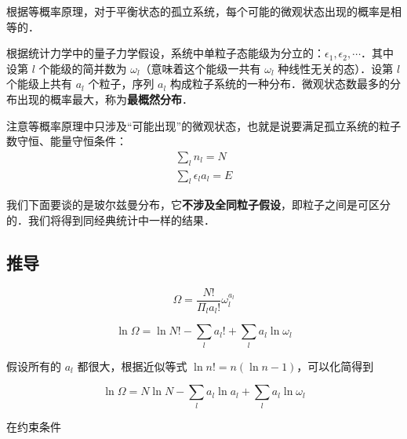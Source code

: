 

根据等概率原理，对于平衡状态的孤立系统，每个可能的微观状态出现的概率是相等的．

根据统计力学中的量子力学假设，系统中单粒子态能级为分立的：$\epsilon_1,\epsilon_2,\cdots$．其中设第 $l$ 个能级的简并数为 $\omega_l$（意味着这个能级一共有 $\omega_l$ 种线性无关的态）．设第 $l$ 个能级上共有 $a_l$ 个粒子，序列 ${a_l}$ 构成粒子系统的一种分布．微观状态数最多的分布出现的概率最大，称为\textbf{最概然分布}．

注意等概率原理中只涉及“可能出现”的微观状态，也就是说要满足孤立系统的粒子数守恒、能量守恒条件：
\begin{equation}\label{MBsta_eq1}
\begin{aligned}
\sum_l n_l=N\\
\sum_l \epsilon_l a_l=E
\end{aligned}
\end{equation}

我们下面要谈的是玻尔兹曼分布，它\textbf{不涉及全同粒子假设}，即粒子之间是可区分的．我们将得到同经典统计中一样的结果．

\subsection{推导}
\begin{equation}
\Omega=\frac{N!}{\Pi_l a_l!}\omega_l^{a_l}
\end{equation}

\begin{equation}
\ln \Omega=\ln N!-\sum_{l}a_l!+\sum_l a_l\ln \omega_l
\end{equation}

假设所有的 $a_l$ 都很大，根据近似等式 $\ln n! = n(\ln n-1)$，可以化简得到

\begin{equation}
\ln \Omega=N\ln N-\sum_l a_l\ln a_l+\sum_l a_l\ln \omega_l
\end{equation}

在约束条件